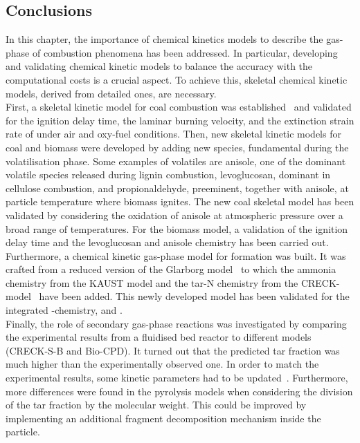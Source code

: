 \begin{refsection}


\newpage
\section{Conclusions}

In this chapter, the importance of chemical kinetics models to describe the gas-phase of combustion phenomena has been addressed. In particular, developing and validating chemical kinetic models to balance the accuracy with the computational costs is a crucial aspect. To achieve this, skeletal chemical kinetic models, derived from detailed ones, are necessary. 
\\
First, a skeletal kinetic model for coal combustion was established~\cite{Cai2019, Cai2020} and validated for the ignition delay time, the laminar burning velocity, and the extinction strain rate of  under air and oxy-fuel conditions. Then, new skeletal kinetic models for coal and biomass were developed by adding new species, fundamental during the volatilisation phase. Some examples of volatiles are anisole, one of the dominant volatile species released during lignin combustion, levoglucosan, dominant in cellulose combustion, and propionaldehyde, preeminent, together with anisole, at particle temperature where biomass ignites. The new coal skeletal model has been validated by considering the oxidation of anisole at atmospheric pressure over a broad range of temperatures. For the biomass model, a validation of the ignition delay time and the levoglucosan and anisole chemistry has been carried out. Furthermore, a chemical kinetic gas-phase model for  formation was built. It was crafted from a reduced version of the Glarborg model~\cite{Glarborg2018} to which the ammonia chemistry from the KAUST model and the tar-N chemistry from the CRECK- model~\cite{Shamooni2021} have been added. This newly developed model has been validated for the integrated -chemistry,  and .
\\
Finally, the role of secondary gas-phase reactions was investigated by comparing the experimental results from a fluidised bed reactor to different models (CRECK-S-B and Bio-CPD). It turned out that the predicted tar fraction was much higher than the experimentally observed one. In order to match the experimental results, some kinetic parameters had to be updated~\cite{Pielsticker2024}. Furthermore, more differences were found in the pyrolysis models when considering the division of the tar fraction by the molecular weight. This could be improved by implementing an additional fragment decomposition mechanism inside the particle.


\Acknowledgement

\renewcommand{\bibname}{References}
\printbibliography[heading=subbibliography]

\end{refsection}
